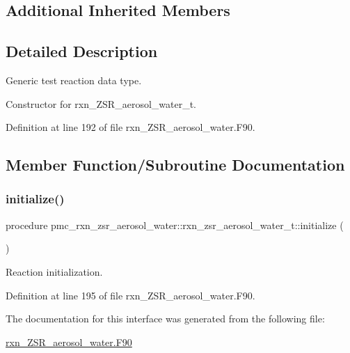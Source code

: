 \subsection*{Additional Inherited Members}


\subsection{Detailed Description}
Generic test reaction data type. 

Constructor for rxn\+\_\+\+Z\+S\+R\+\_\+aerosol\+\_\+water\+\_\+t. 

Definition at line 192 of file rxn\+\_\+\+Z\+S\+R\+\_\+aerosol\+\_\+water.\+F90.



\subsection{Member Function/\+Subroutine Documentation}
\mbox{\label{structpmc__rxn__zsr__aerosol__water_1_1rxn__zsr__aerosol__water__t_a2ca87f29fb1714d4280af0e6c91085f1}} 
\subsubsection{\texorpdfstring{initialize()}{initialize()}}
{\footnotesize\ttfamily procedure pmc\+\_\+rxn\+\_\+zsr\+\_\+aerosol\+\_\+water\+::rxn\+\_\+zsr\+\_\+aerosol\+\_\+water\+\_\+t\+::initialize (\begin{DoxyParamCaption}{ }\end{DoxyParamCaption})\hspace{0.3cm}{\ttfamily [private]}}



Reaction initialization. 



Definition at line 195 of file rxn\+\_\+\+Z\+S\+R\+\_\+aerosol\+\_\+water.\+F90.



The documentation for this interface was generated from the following file\+:\begin{DoxyCompactItemize}
\item 
\mbox{\hyperlink{rxn___z_s_r__aerosol__water_8_f90}{rxn\+\_\+\+Z\+S\+R\+\_\+aerosol\+\_\+water.\+F90}}\end{DoxyCompactItemize}
